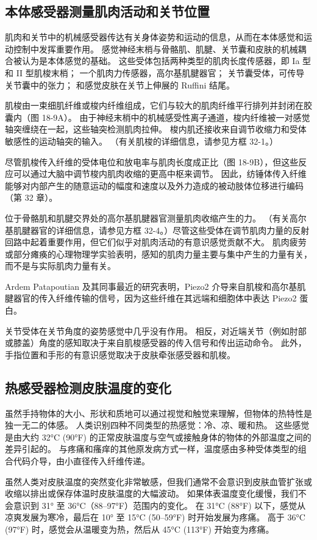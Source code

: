 \subsection{本体感受器测量肌肉活动和关节位置}
肌肉和关节中的机械感受器传达有关身体姿势和运动的信息，从而在本体感觉和运动控制中发挥重要作用。 感觉神经末梢与骨骼肌、肌腱、关节囊和皮肤的机械耦合被认为是本体感觉的基础。 这些受体包括两种类型的肌肉长度传感器，即 Ia 型和 II 型肌梭末梢； 一个肌肉力传感器，高尔基肌腱器官； 关节囊受体，可传导关节囊中的张力； 和感觉皮肤在关节上伸展的 Ruffini 结尾。

肌梭由一束细肌纤维或梭内纤维组成，它们与较大的肌肉纤维平行排列并封闭在胶囊内（图 18-9A）。 由于神经末梢中的机械感受性离子通道，梭内纤维被一对感觉轴突缠绕在一起，这些轴突检测肌肉拉伸。 梭内肌还接收来自调节收缩力和受体敏感性的运动轴突的输入。 （有关肌梭的详细信息，请参见方框 32-1。）

尽管肌梭传入纤维的受体电位和放电率与肌肉长度成正比（图 18-9B），但这些反应可以通过大脑中调节梭内肌肉收缩的更高中枢来调节。 因此，纺锤体传入纤维能够对内部产生的随意运动的幅度和速度以及外力造成的被动肢体位移进行编码（第 32 章）。

位于骨骼肌和肌腱交界处的高尔基肌腱器官测量肌肉收缩产生的力。 （有关高尔基肌腱器官的详细信息，请参见方框 32-4。）尽管这些受体在调节肌肉力量的反射回路中起着重要作用，但它们似乎对肌肉活动的有意识感觉贡献不大。 肌肉疲劳或部分瘫痪的心理物理学实验表明，感知的肌肉力量主要与集中产生的力量有关，而不是与实际肌肉力量有关。

Ardem Patapoutian 及其同事最近的研究表明，Piezo2 介导来自肌梭和高尔基肌腱器官的传入纤维传输的信号，因为这些纤维在其远端和细胞体中表达 Piezo2 蛋白。

关节受体在关节角度的姿势感觉中几乎没有作用。 相反，对近端关节（例如肘部或膝盖）角度的感知取决于来自肌梭感受器的传入信号和传出运动命令。 此外，手指位置和手形的有意识感觉取决于皮肤牵张感受器和肌梭。

\subsection{热感受器检测皮肤温度的变化}
虽然手持物体的大小、形状和质地可以通过视觉和触觉来理解，但物体的热特性是独一无二的体感。 人类识别四种不同类型的热感觉：冷、凉、暖和热。 这些感觉是由大约 32°C (90°F) 的正常皮肤温度与空气或接触身体的物体的外部温度之间的差异引起的。 与疼痛和瘙痒的其他原发病方式一样，温度感由多种受体类型的组合代码介导，由小直径传入纤维传递。

虽然人类对皮肤温度的突然变化非常敏感，但我们通常不会意识到皮肤血管扩张或收缩以排出或保存体温时皮肤温度的大幅波动。 如果体表温度变化缓慢，我们不会意识到 31° 至 36°C（88–97°F）范围内的变化。 在 31°C (88°F) 以下，感觉从凉爽发展为寒冷，最后在 10° 至 15°C (50–59°F) 时开始发展为疼痛。 高于 36°C (97°F) 时，感觉会从温暖变为热，然后从 45°C (113°F) 开始变为疼痛。

